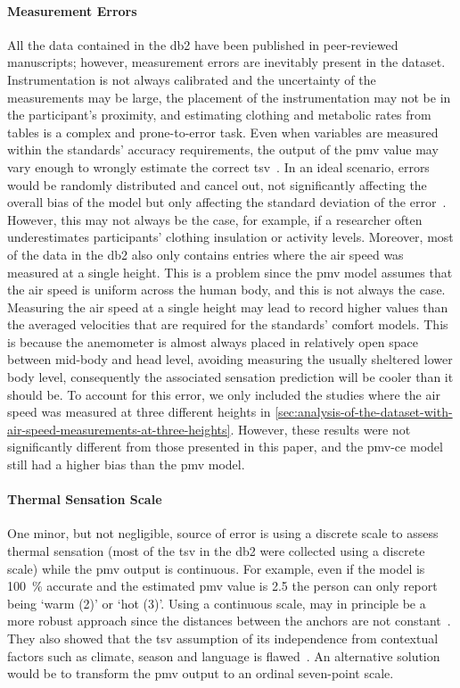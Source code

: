 \paragraph{Measurement Errors}
All the data contained in the \ac{db2} have been published in peer-reviewed manuscripts; however, measurement errors are inevitably present in the dataset.
Instrumentation is not always calibrated and the uncertainty of the measurements may be large, the placement of the instrumentation may not be in the participant's proximity, and estimating clothing and metabolic rates from tables is a complex and prone-to-error task.
Even when variables are measured within the standards' accuracy requirements, the output of the \ac{pmv} value may vary enough to wrongly estimate the correct \ac{tsv}~\cite{dambrosio_alfano_role_2011}.
In an ideal scenario, errors would be randomly distributed and cancel out, not significantly affecting the overall bias of the model but only affecting the standard deviation of the error~\cite{Humphreys2002}.
However, this may not always be the case, for example, if a researcher often underestimates participants' clothing insulation or activity levels.
Moreover, most of the data in the \ac{db2} also only contains entries where the air speed was measured at a single height.
This is a problem since the \ac{pmv} model assumes that the air speed is uniform across the human body, and this is not always the case.
Measuring the air speed at a single height may lead to record higher values than the averaged velocities that are required for the standards’ comfort models.
This is because the anemometer is almost always placed in relatively open space between mid-body and head level, avoiding measuring the usually sheltered lower body level, consequently the associated sensation prediction will be cooler than it should be.
To account for this error, we only included the studies where the air speed was measured at three different heights in \ref{sec:analysis-of-the-dataset-with-air-speed-measurements-at-three-heights}.
However, these results were not significantly different from those presented in this paper, and the \ac{pmv-ce} model still had a higher bias than the \ac{pmv} model.

\paragraph{Thermal Sensation Scale}
One minor, but not negligible, source of error is using a discrete scale to assess thermal sensation (most of the \ac{tsv} in the \ac{db2} were collected using a discrete scale) while the \ac{pmv} output is continuous.
For example, even if the model is \qty{100}{\percent} accurate and the estimated \ac{pmv} value is \num{2.5} the person can only report being `warm (\num{2})' or `hot (\num{3})'.
Using a continuous scale, may in principle be a more robust approach since the distances between the anchors are not constant~\cite{schweiker2019scales, schweiker2020evaluating}.
They also showed that the \ac{tsv} assumption of its independence from contextual factors such as climate, season and language is flawed~\cite{schweiker2019scales, schweiker2020evaluating}.
An alternative solution would be to transform the \ac{pmv} output to an ordinal seven-point scale.